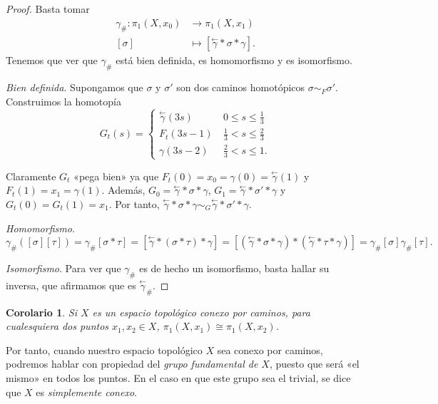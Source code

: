 \documentclass[12pt,a4paper]{book}
\newtheorem{corol}[thm]{Corolario}
\theoremstyle{definition} \newtheorem{defn}[thm]{Definición}
\theoremstyle{definition} \newtheorem{ejemplo}[thm]{Ejemplo}
\theoremstyle{definition} \newtheorem{ejercicio}[thm]{Ejercicio}
\theoremstyle{remark} \newtheorem*{obs}{Observación}
\def\gf{\pi_1}
\newcommand\cev[1]{\overset{\leftarrow}{#1}}
\begin{document}
\begin{proof}
  Basta tomar
  \begin{align*}
    \gamma_{\#} :\gf(X,x_0)&\longrightarrow \gf(X,x_1)\\ 
    [\sigma] &\longmapsto [\cev{\gamma}*\sigma*\gamma].
    \end{align*}
    Tenemos que ver que $\gamma_{\#}$ está bien definida, es homomorfismo y es isomorfismo.

    \textit{Bien definida}. Supongamos que $\sigma$ y $\sigma'$ son dos caminos homotópicos $\sigma \sim_F \sigma'$. Construimos la homotopía
    \begin{equation*}
      G_t(s)=
      \begin{cases}
	\cev{\gamma}(3s) & \ 0\leq s \leq \tfrac{1}{3} \\
	F_t(3s-1) & \ \tfrac{1}{3} < s \leq \tfrac{2}{3} \\
	\gamma(3s-2) & \ \tfrac{2}{3} < s \leq 1.
      \end{cases}
    \end{equation*}

Claramente $G_t$ «pega bien» ya que $F_t(0)=x_0=\gamma(0)=\cev{\gamma}(1)$ y $F_t(1)=x_1=\gamma(1)$. Además, $G_0=\cev{\gamma}*\sigma*\gamma$, $G_1=\cev{\gamma}*\sigma'*\gamma$ y $G_t(0)=G_t(1)=x_1$. Por tanto, $\cev{\gamma}*\sigma*\gamma \sim_G \cev{\gamma}*\sigma'*\gamma$.

\textit{Homomorfismo}. 
\begin{equation*}
  \gamma_{\#}([\sigma][\tau])= \gamma_{\#}[\sigma*\tau]=[\cev{\gamma}*(\sigma*\tau)*\gamma]=[(\cev{\gamma}*\sigma*\gamma)*(\cev{\gamma}*\tau*\gamma)]=\gamma_{\#}[\sigma]\gamma_{\#}[\tau].
\end{equation*}

\textit{Isomorfismo}. Para ver que $\gamma_{\#}$ es de hecho un isomorfismo, basta hallar su inversa, que afirmamos que es $\cev{\gamma}_{\#}$.
\end{proof}

\begin{corol}
  Si $X$ es un espacio topológico conexo por caminos, para cualesquiera dos puntos $x_1,x_2 \in X$, $\gf(X,x_1)\cong\gf(X,x_2)$.
\end{corol}

Por tanto, cuando nuestro espacio topológico $X$ sea conexo por caminos, podremos hablar con propiedad del \emph{grupo fundamental de $X$}, puesto que será «el mismo» en todos los puntos. En el caso en que este grupo sea el trivial, se dice que $X$ es \emph{simplemente conexo}.
\end{document}

